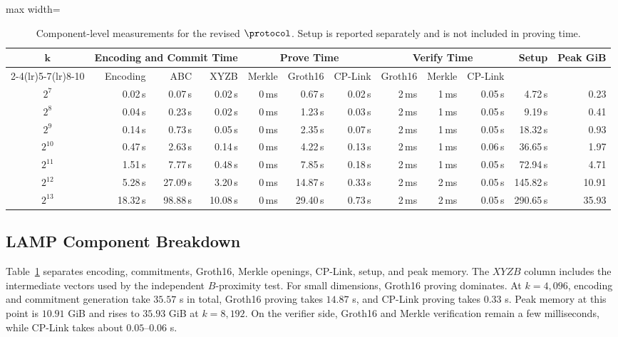 \begin{table}[!t]
\centering
\scriptsize
\setlength{\tabcolsep}{2.3pt}
\begin{adjustbox}{max width=\textwidth}
\begin{tabular}{c rrr rrr rrr rr}
\toprule
\multirow{2}{*}{\(\boldsymbol{k}\)}
& \multicolumn{3}{c}{\textbf{Encoding and Commit Time}}
& \multicolumn{3}{c}{\textbf{Prove Time}}
& \multicolumn{3}{c}{\textbf{Verify Time}}
& \multirow{2}{*}{\textbf{Setup}}
& \multirow{2}{*}{\textbf{Peak GiB}} \\
\cmidrule(lr){2-4}\cmidrule(lr){5-7}\cmidrule(lr){8-10}
& Encoding & ABC & XYZB
& Merkle & Groth16 & CP-Link
& Groth16 & Merkle & CP-Link & & \\
\midrule
$2^7$    & 0.02\,s & 0.07\,s & 0.02\,s & 0\,ms & 0.67\,s & 0.02\,s & 2\,ms & 1\,ms & 0.05\,s & 4.72\,s   & 0.23 \\
$2^8$    & 0.04\,s & 0.23\,s & 0.02\,s & 0\,ms & 1.23\,s & 0.03\,s & 2\,ms & 1\,ms & 0.05\,s & 9.19\,s   & 0.41 \\
$2^9$    & 0.14\,s & 0.73\,s & 0.05\,s & 0\,ms & 2.35\,s & 0.07\,s & 2\,ms & 1\,ms & 0.05\,s & 18.32\,s  & 0.93 \\
$2^{10}$ & 0.47\,s & 2.63\,s & 0.14\,s & 0\,ms & 4.22\,s & 0.13\,s & 2\,ms & 1\,ms & 0.06\,s & 36.65\,s  & 1.97 \\
$2^{11}$ & 1.51\,s & 7.77\,s & 0.48\,s & 0\,ms & 7.85\,s & 0.18\,s & 2\,ms & 1\,ms & 0.05\,s & 72.94\,s  & 4.71 \\
$2^{12}$ & 5.28\,s & 27.09\,s & 3.20\,s & 0\,ms & 14.87\,s & 0.33\,s & 2\,ms & 2\,ms & 0.05\,s & 145.82\,s & 10.91 \\
$2^{13}$ & 18.32\,s & 98.88\,s & 10.08\,s & 0\,ms & 29.40\,s & 0.73\,s & 2\,ms & 2\,ms & 0.05\,s & 290.65\,s & 35.93 \\
\bottomrule
\end{tabular}
\end{adjustbox}
\vspace{4pt}
\caption{Component-level measurements for the revised \(\protocol\).
Setup is reported separately and is not included in proving time.}
\label{tab:lamp-breakdown}
\end{table}

\subsection{LAMP Component Breakdown}
Table~\ref{tab:lamp-breakdown} separates encoding, commitments, Groth16,
Merkle openings, CP-Link, setup, and peak memory.  The \(XYZB\) column includes
the intermediate vectors used by the independent \(B\)-proximity test.  For
small dimensions, Groth16 proving dominates.  At \(k=4{,}096\), encoding and
commitment generation take \(35.57\) s in total, Groth16 proving takes
\(14.87\) s, and CP-Link proving takes \(0.33\) s.  Peak memory at this point
is \(10.91\) GiB and rises to \(35.93\) GiB at \(k=8{,}192\).  On the verifier
side, Groth16 and Merkle verification remain a few milliseconds, while CP-Link
takes about \(0.05\)--\(0.06\) s.

